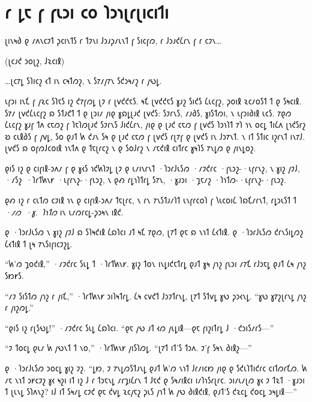 \chapter{𐑩 𐑛𐑱 𐑝 𐑝𐑧𐑮𐑦 𐑤𐑴 𐑐𐑮𐑪𐑚𐑩𐑚𐑦𐑤𐑦𐑑𐑦}

\begin{chapterOpeningQuote}
\noindent
𐑚𐑦𐑯𐑰𐑔 𐑞 𐑥𐑵𐑯𐑤𐑲𐑑 𐑜𐑤𐑦𐑯𐑑𐑕 𐑩 𐑑𐑲𐑯𐑦 𐑓𐑮𐑨𐑜𐑥𐑧𐑯𐑑 𐑝 𐑕𐑦𐑤𐑝𐑼, 𐑩 𐑓𐑮𐑨𐑒𐑖𐑩𐑯 𐑝 𐑩 𐑤𐑲𐑯…

\vspace*{2ex}
(𐑚𐑤𐑨𐑒 𐑮𐑴𐑚𐑟, 𐑓𐑷𐑤𐑦𐑙)

\vspace*{2ex}
…𐑚𐑤𐑳𐑛 𐑕𐑐𐑦𐑤𐑟 𐑬𐑑 𐑦𐑯 𐑤𐑰𐑑𐑼𐑟, 𐑯 𐑕𐑳𐑥𐑢𐑳𐑯 𐑕𐑒𐑮𐑰𐑥𐑟 𐑩 𐑢𐑻𐑛.
\end{chapterOpeningQuote}

\lettrine{𐑧}{𐑝𐑮𐑦} 𐑦𐑯𐑗 𐑝 𐑢𐑷𐑤 𐑕𐑐𐑱𐑕 𐑦𐑟 𐑒𐑳𐑝𐑼𐑛 𐑚𐑲 𐑩 𐑚𐑫𐑒𐑒𐑱𐑕. 𐑰𐑗 𐑚𐑫𐑒𐑒𐑱𐑕 𐑣𐑨𐑟 𐑕𐑦𐑒𐑕 𐑖𐑧𐑤𐑝𐑟, 𐑜𐑴𐑦𐑙 𐑷𐑤𐑥𐑴𐑕𐑑 𐑑 𐑞 𐑕𐑰𐑤𐑦𐑙. 𐑕𐑳𐑥 𐑚𐑫𐑒𐑖𐑧𐑤𐑝𐑟 𐑸 𐑕𐑑𐑨𐑒𐑑 𐑑 𐑞 𐑚𐑮𐑦𐑥 𐑢𐑦𐑞 𐑣𐑸𐑛𐑚𐑨𐑒 𐑚𐑫𐑒𐑕: 𐑕𐑲𐑩𐑯𐑕, 𐑥𐑨𐑔𐑕, 𐑣𐑦𐑕𐑑𐑼𐑦, 𐑯 𐑧𐑝𐑮𐑦𐑔𐑦𐑙 𐑧𐑤𐑕. 𐑳𐑞𐑼 𐑖𐑧𐑤𐑝𐑟 𐑣𐑨𐑝 𐑑𐑵 𐑤𐑱𐑼𐑟 𐑝 𐑐𐑱𐑐𐑼𐑚𐑨𐑒 𐑕𐑲𐑩𐑯𐑕 𐑓𐑦𐑒𐑖𐑩𐑯, 𐑢𐑦𐑞 𐑞 𐑚𐑨𐑒 𐑤𐑱𐑼 𐑝 𐑚𐑫𐑒𐑕 𐑐𐑮𐑪𐑐𐑑 𐑳𐑐 𐑪𐑯 𐑴𐑤𐑛 𐑑𐑦𐑖𐑵 𐑚𐑪𐑒𐑕𐑩𐑟\authorsnotefootnotemark{} 𐑹 𐑤𐑧𐑙𐑔𐑕 𐑝 𐑢𐑫𐑛, 𐑕𐑴 𐑞𐑨𐑑 𐑿 𐑒𐑨𐑯 𐑕𐑰 𐑞 𐑚𐑨𐑒 𐑤𐑱𐑼 𐑝 𐑚𐑫𐑒𐑕 𐑩𐑚𐑳𐑝 𐑞 𐑚𐑫𐑒𐑕 𐑦𐑯 𐑓𐑮𐑳𐑯𐑑. 𐑯 𐑦𐑑 𐑕𐑑𐑦𐑤 𐑦𐑟𐑩𐑯𐑑 𐑦𐑯𐑳𐑓. 𐑚𐑫𐑒𐑕 𐑸 𐑴𐑝𐑼𐑓𐑤𐑴𐑦𐑙 𐑪𐑯𐑑𐑵 𐑞 𐑑𐑱𐑚𐑩𐑤𐑟 𐑯 𐑞 𐑕𐑴𐑓𐑩𐑟 𐑯 𐑥𐑱𐑒𐑦𐑙 𐑤𐑦𐑑𐑩𐑤 𐑣𐑰𐑐𐑕 𐑳𐑯𐑛𐑼 𐑞 𐑢𐑦𐑯𐑛𐑴𐑟.

𐑞𐑦𐑕 𐑦𐑟 𐑞 𐑤𐑦𐑝𐑦𐑙-𐑮𐑵𐑥 𐑝 𐑞 𐑣𐑬𐑕 𐑪𐑒𐑿𐑐𐑲𐑛 𐑚𐑲 𐑞 𐑧𐑥𐑦𐑯𐑩𐑯𐑑 ·𐑐𐑮𐑩𐑓𐑧𐑕𐑼 ·𐑥𐑲𐑒𐑩𐑤 ·𐑝𐑧𐑮𐑟-·𐑧𐑝𐑩𐑯𐑟, 𐑯 𐑣𐑦𐑟 𐑢𐑲𐑓, ·𐑥𐑕𐑟~·𐑐𐑩𐑑𐑿𐑯𐑾 ·𐑧𐑝𐑩𐑯𐑟-·𐑝𐑧𐑮𐑟, 𐑯 𐑞𐑺 𐑩𐑛𐑪𐑐𐑑𐑩𐑛 𐑕𐑳𐑯, ·𐑣𐑨𐑮𐑦 ·𐑡𐑱𐑥𐑟 ·𐑐𐑪𐑑𐑼-·𐑧𐑝𐑩𐑯𐑟-·𐑝𐑧𐑮𐑟.

𐑞𐑺 𐑦𐑟 𐑩 𐑤𐑧𐑑𐑼 𐑤𐑲𐑦𐑙 𐑪𐑯 𐑞 𐑤𐑦𐑝𐑦𐑙-𐑮𐑵𐑥 𐑑𐑱𐑚𐑩𐑤, 𐑯 𐑩𐑯 𐑳𐑯𐑕𐑑𐑨𐑥𐑐𐑑 𐑧𐑯𐑝𐑩𐑤𐑴𐑐 𐑝 𐑘𐑧𐑤𐑴𐑦𐑖 𐑐𐑸𐑗𐑥𐑩𐑯𐑑, 𐑩𐑛𐑮𐑧𐑕𐑑 𐑑 \emph{·𐑥𐑼~·𐑣.~𐑐𐑪𐑑𐑼} 𐑦𐑯 𐑧𐑥𐑼𐑩𐑤𐑛-𐑜𐑮𐑰𐑯 𐑦𐑙𐑒.

𐑞 ·𐑐𐑮𐑩𐑓𐑧𐑕𐑼 𐑯 𐑣𐑦𐑟 𐑢𐑲𐑓 𐑸 𐑕𐑐𐑰𐑒𐑦𐑙 𐑖𐑸𐑐𐑤𐑦 𐑨𐑑 𐑰𐑗 𐑳𐑞𐑼, 𐑚𐑳𐑑 𐑞𐑱 𐑸 𐑯𐑪𐑑 𐑖𐑬𐑑𐑦𐑙. 𐑞 ·𐑐𐑮𐑩𐑓𐑧𐑕𐑼 𐑒𐑩𐑯𐑕𐑦𐑛𐑼𐑟 𐑖𐑬𐑑𐑦𐑙 𐑑 𐑚𐑰 𐑳𐑯𐑕𐑦𐑝𐑦𐑤𐑲𐑟𐑛.

“𐑿'𐑼 𐑡𐑴𐑒𐑦𐑙,” ·𐑥𐑲𐑒𐑩𐑤 𐑕𐑧𐑛 𐑑 ·𐑐𐑩𐑑𐑿𐑯𐑾. 𐑣𐑦𐑟 𐑑𐑴𐑯 𐑦𐑯𐑛𐑦𐑒𐑱𐑑𐑩𐑛 𐑞𐑨𐑑 𐑣𐑰 𐑢𐑪𐑟 𐑝𐑧𐑮𐑦 𐑥𐑳𐑗 𐑩𐑓𐑮𐑱𐑛 𐑞𐑨𐑑 𐑖𐑰 𐑢𐑪𐑟 𐑕𐑽𐑾𐑕.

“𐑥𐑲 𐑕𐑦𐑕𐑑𐑼 𐑢𐑪𐑟 𐑩 𐑢𐑦𐑗,” ·𐑐𐑩𐑑𐑿𐑯𐑾 𐑮𐑦𐑐𐑰𐑑𐑩𐑛. 𐑖𐑰 𐑤𐑫𐑒𐑑 𐑓𐑮𐑲𐑑𐑩𐑯𐑛, 𐑚𐑳𐑑 𐑕𐑑𐑫𐑛 𐑣𐑻 𐑜𐑮𐑬𐑯𐑛. “𐑣𐑻 𐑣𐑳𐑟𐑚𐑩𐑯𐑛 𐑢𐑪𐑟 𐑩 𐑢𐑦𐑟𐑼𐑛.”

“𐑞𐑦𐑕 𐑦𐑟 𐑩𐑚𐑕𐑻𐑛!” ·𐑥𐑲𐑒𐑩𐑤 𐑕𐑧𐑛 𐑖𐑸𐑐𐑤𐑦. “𐑞𐑱 𐑢𐑻 𐑨𐑑 𐑬𐑼 𐑢𐑧𐑛𐑦𐑙—𐑞𐑱 𐑝𐑦𐑟𐑦𐑑𐑩𐑛 𐑓 ·𐑒𐑮𐑦𐑕𐑥𐑩𐑕—”

“𐑲 𐑑𐑴𐑤𐑛 𐑞𐑧𐑥 𐑿 𐑢𐑻𐑯𐑑 𐑑 𐑯𐑴,” ·𐑐𐑩𐑑𐑿𐑯𐑾 𐑢𐑦𐑕𐑐𐑼𐑛. “𐑚𐑳𐑑 𐑦𐑑'𐑕 𐑑𐑮𐑵. 𐑲'𐑝 𐑕𐑰𐑯 𐑔𐑦𐑙𐑟—”

𐑞 ·𐑐𐑮𐑩𐑓𐑧𐑕𐑼 𐑮𐑴𐑤𐑛 𐑣𐑦𐑟 𐑲𐑟. “𐑛𐑽, 𐑲 𐑳𐑯𐑛𐑼𐑕𐑑𐑨𐑯𐑛 𐑞𐑨𐑑 𐑿'𐑼 𐑯𐑪𐑑 𐑓𐑩𐑥𐑦𐑤𐑽 𐑢𐑦𐑞 𐑞 𐑕𐑒𐑧𐑐𐑑𐑦𐑒𐑩𐑤 𐑤𐑦𐑑𐑼𐑩𐑗𐑼. 𐑿 𐑥𐑱 𐑯𐑪𐑑 𐑮𐑾𐑤𐑲𐑟 𐑣𐑬 𐑰𐑟𐑦 𐑦𐑑 𐑦𐑟 𐑓 𐑩 𐑑𐑮𐑱𐑯𐑛 𐑥𐑩𐑡𐑦𐑖𐑩𐑯 𐑑 𐑓𐑱𐑒 𐑞 𐑕𐑰𐑥𐑦𐑙𐑤𐑦 𐑦𐑥𐑐𐑪𐑕𐑩𐑚𐑩𐑤. 𐑮𐑦𐑥𐑧𐑥𐑚𐑼 𐑣𐑬 𐑲 𐑑𐑷𐑑 ·𐑣𐑨𐑮𐑦 𐑑 𐑚𐑧𐑯𐑛 𐑕𐑐𐑵𐑯𐑟? 𐑦𐑓 𐑦𐑑 𐑕𐑰𐑥𐑛 𐑤𐑲𐑒 𐑞𐑱 𐑒𐑫𐑛 𐑷𐑤𐑢𐑱𐑟 𐑜𐑧𐑕 𐑢𐑪𐑑 𐑿 𐑢𐑻 𐑔𐑦𐑙𐑒𐑦𐑙, 𐑞𐑨𐑑'𐑕 𐑒𐑷𐑤𐑛 𐑒𐑴𐑤𐑛 𐑮𐑰𐑛𐑦𐑙—”

